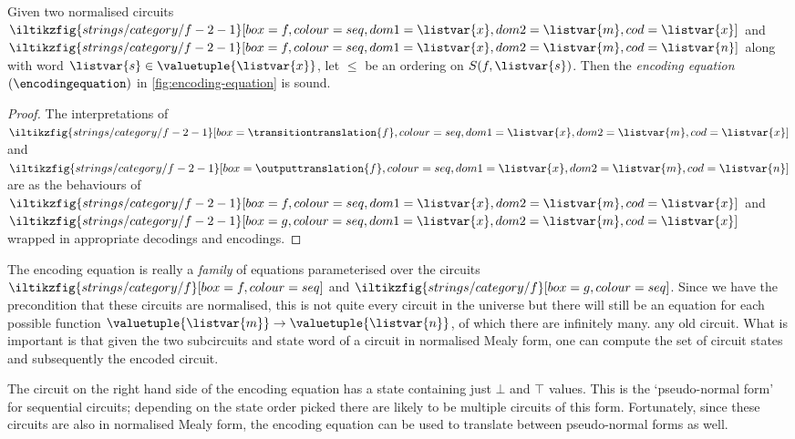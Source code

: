 \begin{proposition}\label{prop:encoding-equation}
    Given two normalised circuits \(
    \iltikzfig{strings/category/f-2-1}[box=f,colour=seq,dom1=\listvar{x},dom2=\listvar{m},cod=\listvar{x}]
    \) and \(
    \iltikzfig{strings/category/f-2-1}[box=f,colour=seq,dom1=\listvar{x},dom2=\listvar{m},cod=\listvar{n}]
    \) along with word \(\listvar{s} \in \valuetuple{\listvar{x}}\), let
    \(\leq\) be an ordering on \(S(f,\listvar{s})\).
    Then the \emph{encoding equation} \((\encodingequation)\) in
    \cref{fig:encoding-equation} is sound.
\end{proposition}
\begin{proof}
    The interpretations of \(
    \iltikzfig{strings/category/f-2-1}[box={\transitiontranslation{f}},colour=seq,dom1=\listvar{x},dom2=\listvar{m},cod=\listvar{x}]
    \) and \(
    \iltikzfig{strings/category/f-2-1}[box={\outputtranslation{f}},colour=seq,dom1=\listvar{x},dom2=\listvar{m},cod=\listvar{n}]
    \) are as the behaviours of \(
    \iltikzfig{strings/category/f-2-1}[box={f},colour=seq,dom1=\listvar{x},dom2=\listvar{m},cod=\listvar{x}]
    \) and \(
    \iltikzfig{strings/category/f-2-1}[box={g},colour=seq,dom1=\listvar{x},dom2=\listvar{m},cod=\listvar{x}]
    \) wrapped in appropriate decodings and encodings.
\end{proof}



\begin{remark}
    The encoding equation is really a \emph{family} of equations parameterised
    over the circuits \(
    \iltikzfig{strings/category/f}[box=f,colour=seq]
    \) and \(
    \iltikzfig{strings/category/f}[box=g,colour=seq]
    \).
    Since we have the precondition that these circuits are normalised, this is
    not quite every circuit in the universe but there will still be an equation
    for each possible function \(
    \valuetuple{\listvar{m}} \to \valuetuple{\listvar{n}}
    \), of which there are infinitely many.
    any old circuit.
    What is important is that given the two subcircuits and state word of a
    circuit in normalised Mealy form, one can compute the set of circuit states
    and subsequently the encoded circuit.
\end{remark}

The circuit on the right hand side of the encoding equation has a state
containing just \(\bot\) and \(\top\) values.
This is the `pseudo-normal form' for sequential circuits; depending on the
state order picked there are likely to be multiple circuits of this form.
Fortunately, since these circuits are also in normalised Mealy form, the
encoding equation can be used to translate between pseudo-normal forms as well.

